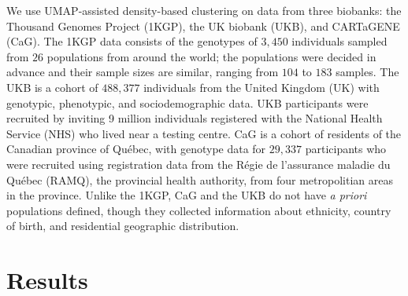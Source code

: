We use UMAP-assisted density-based clustering on data from three biobanks: the Thousand Genomes Project (1KGP), the UK biobank (UKB), and CARTaGENE (CaG). The 1KGP data consists of the genotypes of $3,450$ individuals sampled from $26$ populations from around the world; the populations were decided in advance and their sample sizes are similar, ranging from $104$ to $183$ samples\citep{global_2015}. The UKB is a cohort of $488,377$ individuals from the United Kingdom (UK) with genotypic, phenotypic, and sociodemographic data. UKB participants were recruited by inviting 9 million individuals registered with the National Health Service (NHS) who lived near a testing centre\citep{sudlow_uk_2015}. CaG is a cohort of residents of the Canadian province of Qu\'{e}bec, with genotype data for $29,337$ participants who were recruited using registration data from the R\'{e}gie de l'assurance maladie du Qu\'{e}bec (RAMQ), the provincial health authority, from four metropolitian areas in the province\citep{awadalla_cohort_2013}. Unlike the 1KGP, CaG and the UKB do not have \emph{a priori} populations defined, though they collected information about ethnicity, country of birth, and residential geographic distribution.

\clearpage

\section{Results}


